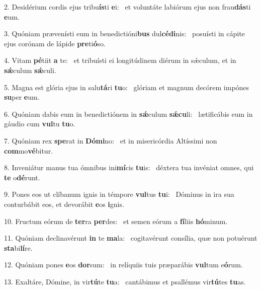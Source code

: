 2. Desidérium cordis ejus tribu\textbf{ís}ti \textbf{e}i: \ast\  et voluntáte labiórum ejus non frau\textbf{dás}ti \textbf{e}um.\

3. Quóniam prævenísti eum in benedictióni\textbf{bus} dul\textbf{cé}\textbf{di}nis: \ast\  posuísti in cápite ejus corónam de lápide \textbf{pre}ti\textbf{ó}so.\

4. Vitam \textbf{pé}tiit \textbf{a} te: \ast\  et tribuísti ei longitúdinem diérum in sǽculum, et in \textbf{sǽ}culum \textbf{sǽ}culi.\

5. Magna est glória ejus in salu\textbf{tá}ri \textbf{tu}o: \ast\  glóriam et magnum decórem impónes \textbf{su}per \textbf{e}um.\

6. Quóniam dabis eum in benedictiónem in \textbf{sǽ}culum \textbf{sǽ}\textbf{cu}li: \ast\  lætificábis eum in gáudio cum \textbf{vul}tu \textbf{tu}o.\

7. Quóniam rex \textbf{spe}rat in \textbf{Dó}\textbf{mi}no: \ast\  et in misericórdia Altíssimi non \textbf{com}mo\textbf{vé}bitur.\

8. Inveniátur manus tua ómnibus ini\textbf{mí}cis \textbf{tu}is: \ast\  déxtera tua invéniat omnes, qui \textbf{te} o\textbf{dé}runt.\

9. Pones eos ut clíbanum ignis in témpore \textbf{vul}tus \textbf{tu}i: \ast\  Dóminus in ira sua conturbábit eos, et devorábit \textbf{e}os \textbf{i}gnis.\

10. Fructum eórum de \textbf{ter}ra \textbf{per}des: \ast\  et semen eórum a \textbf{fí}liis \textbf{hó}minum.\

11. Quóniam declinavérunt \textbf{in} te \textbf{ma}la: \ast\  cogitavérunt consília, quæ non potuérunt \textbf{sta}bi\textbf{lí}re.\

12. Quóniam pones \textbf{e}os \textbf{dor}sum: \ast\  in relíquiis tuis præparábis \textbf{vul}tum e\textbf{ó}rum.\

13. Exaltáre, Dómine, in vir\textbf{tú}te \textbf{tu}a: \ast\  cantábimus et psallémus vir\textbf{tú}tes \textbf{tu}as.\

